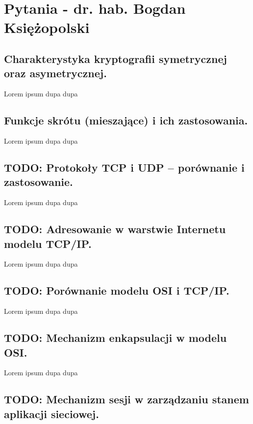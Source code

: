 \documentclass[a4paper,12pt,oneside]{book}
\begin{document}
	\tableofcontents
	\newpage

	\chapter{Pytania - dr. hab. Bogdan Księżopolski}
		
		\setcounter{section}{65}
		\section{Charakterystyka kryptografii symetrycznej oraz asymetrycznej.}
		
		Lorem ipsum dupa dupa
		
		\setcounter{section}{1}
		\section{Funkcje skrótu (mieszające) i ich zastosowania. }
		
		Lorem ipsum dupa dupa
		
		\setcounter{section}{8}
		\section{\color{red} TODO: Protokoły TCP i UDP – porównanie i zastosowanie.}
		
		Lorem ipsum dupa dupa
		
		\setcounter{section}{9}
		\section{\color{red} TODO: Adresowanie w warstwie Internetu modelu TCP/IP.}
		
		Lorem ipsum dupa dupa
		
		\setcounter{section}{11}
		\section{\color{red} TODO: Porównanie modelu OSI i TCP/IP. }
		
		Lorem ipsum dupa dupa
		
		\setcounter{section}{12}
		\section{\color{red} TODO: Mechanizm enkapsulacji w modelu OSI. }
		
		Lorem ipsum dupa dupa
		
		\setcounter{section}{57}
		\section{\color{red} TODO: Mechanizm sesji w zarządzaniu stanem aplikacji sieciowej. }
		
\end{document}
